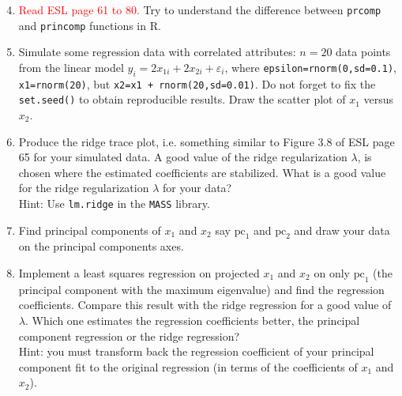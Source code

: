 \documentclass[
size=12pt,
paper=screen,
mode=handout,
style=simple,
nopagebreaks,
fleqn
]{powerdot}
\begin{document}
\begin{slide}{}
\begin{enumerate}
    \setcounter{enumi}{3}
\item \textcolor{red}{Read ESL page 61 to 80.} Try to understand the difference between \texttt{\color{blue}prcomp} and \texttt{\color{blue}princomp} functions in R.\\

 \vspace{0.2in}
\item Simulate some regression data with correlated attributes: $n=20$ data points from the linear model  $y_i=2x_{1i}+2x_{2i}+\varepsilon_i$, where \texttt{epsilon=rnorm(0,sd=0.1)},  \texttt{x1=rnorm(20)}, but \texttt{x2=x1 + rnorm(20,sd=0.01)}. Do not forget to fix the \texttt{set.seed()} to obtain reproducible results.  Draw the scatter plot of $x_1$ versus $x_2$.

 \vspace{0.2in}
    \item Produce the ridge trace plot, i.e. something similar to Figure 3.8 of ESL page 65 for your simulated data. A good value of the ridge regularization $\lambda$, is chosen where the estimated coefficients are stabilized. What is a good value for the ridge regularization $\lambda$ for your data?\\ 
  Hint: Use \texttt{lm.ridge} in the \texttt{MASS} library.


 \vspace{0.2in}
   \item Find principal components of $x_1$ and $x_2$ say $\mathrm{pc}_1$ and $\mathrm{pc}_2$ and draw your data on the principal components axes.


 \vspace{0.2in}
  \item Implement a least squares regression on projected $x_1$ and $x_2$ on only $\mathrm{pc}_1$ (the principal component with the maximum eigenvalue) and find the regression coefficients. Compare this result with the ridge regression for a good value of $\lambda$. Which one estimates the regression coefficients better, the principal component regression or the ridge regression?\\
 Hint: you must transform back the regression coefficient of your principal component fit to the original regression (in terms of the coefficients of $x_1$ and $x_2$). 

\end{enumerate}
\end{slide}
\end{document}
